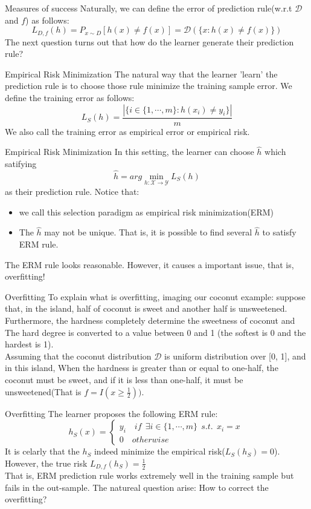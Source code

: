 \documentclass{beamer}
\begin{document}
\begin{frame}{Measures of success}
	Naturally, we can define the error of prediction rule(w.r.t $\mathcal{D}$ and $f$) as follows:
	\[L_{D,f}(h) = P_{x \sim D} [h(x) \neq f(x)] = \mathcal{D}(\{x:h(x) \neq f(x)\})\]
The next question turns out that how do the learner generate their prediction rule?
\end{frame}
\begin{frame}{Empirical Risk Minimization}
	The natural way that the learner 'learn' the prediction rule is to choose those rule minimize the training sample error. We define the training error as follows:
	\[L_S (h) = \frac{|\{i \in \{1, \cdots, m\}: h(x_i) \neq y_i\}|}{m}\]
	We also call the training error as empirical error or empirical risk.
\end{frame}
\begin{frame}{Empirical Risk Minimization}
	In this setting, the learner can choose $\hat{h}$ which satifying 
	\[\hat{h} = arg \min_{h:\mathcal{X} \rightarrow \mathcal{Y}} L_S(h)\]
	as their prediction rule.
Notice that:
\begin{itemize}
	\item  we call this selection paradigm as empirical risk minimization(ERM)
	\item  The $\hat{h}$ may not be unique. That is, it is possible to find several $\hat{h}$ to satisfy ERM rule.
\end{itemize}
The ERM rule looks reasonable. However, it causes a important issue, that is, overfitting!
\end{frame}
\begin{frame}{Overfitting}
	To explain what is overfitting, imaging our coconut example: suppose that, in the island, half of coconut is sweet and another half is unsweetened. Furthermore, the hardness completely determine the sweetness of coconut and The hard degree is converted to a value between 0 and 1 (the softest is 0 and the hardest is 1). \\
	Assuming that the coconut distribution $\mathcal{D}$ is uniform distribution over [0, 1], and in this island, When the hardness is greater than or equal to one-half, the coconut must be sweet, and if it is less than one-half, it must be unsweetened(That is $f = I(x \geq \frac{1}{2}))$.
\end{frame}
\begin{frame}{Overfitting}
The learner proposes the following ERM rule:
\[h_S(x) = \begin{cases} 
	y_i \quad if\ \ \exists i \in \{1,\cdots,m\} \ \ s.t.\ \ x_i=x\	 \\
	0 \quad otherwise
	\end{cases}	
	\]
	It is celarly that the $h_S$ indeed minimize the empirical risk($L_S(h_S) =0$). However, the true risk $L_{D,f}(h_S) = \frac{1}{2}$ \\
	That is, ERM prediction rule works extremely well in the training sample but fails in the out-sample. The natureal question arise: How to correct the overfitting?
\end{frame}
\end{document}
